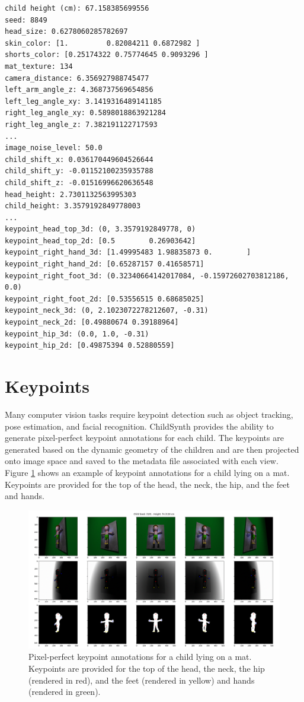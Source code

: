 \documentclass{article}
\begin{document}
\begin{lstlisting}[caption={Example metadata file}]
child height (cm): 67.158385699556 
seed: 8849
head_size: 0.6278060285782697
skin_color: [1.         0.82084211 0.6872982 ]
shorts_color: [0.25174322 0.75774645 0.9093296 ]
mat_texture: 134
camera_distance: 6.356927988745477
left_arm_angle_z: 4.368737569654856
left_leg_angle_xy: 3.1419316489141185
right_leg_angle_xy: 0.5898018863921284
right_leg_angle_z: 7.382191122717593
...
image_noise_level: 50.0
child_shift_x: 0.036170449604526644
child_shift_y: -0.01152100235935788
child_shift_z: -0.01516996620636548
head_height: 2.7301132563995303
child_height: 3.3579192849778003
...
keypoint_head_top_3d: (0, 3.3579192849778, 0)
keypoint_head_top_2d: [0.5        0.26903642]
keypoint_right_hand_3d: [1.49995483 1.98835873 0.        ]
keypoint_right_hand_2d: [0.65287157 0.41658571]
keypoint_right_foot_3d: (0.32340664142017084, -0.15972602703812186, 0.0)
keypoint_right_foot_2d: [0.53556515 0.68685025]
keypoint_neck_3d: (0, 2.1023072278212607, -0.31)
keypoint_neck_2d: [0.49880674 0.39188964]
keypoint_hip_3d: (0.0, 1.0, -0.31)
keypoint_hip_2d: [0.49875394 0.52880559]
\end{lstlisting}
\section{Keypoints}
Many computer vision tasks require keypoint detection such as object tracking, pose estimation, and facial recognition. ChildSynth provides the ability to generate pixel-perfect keypoint annotations for each child. The keypoints are generated based on the dynamic geometry of the children and are then projected onto image space and saved to the metadata file associated with each view. Figure \ref{fig:keypoints} shows an example of keypoint annotations for a child lying on a mat. Keypoints are provided for the top of the head, the neck, the hip, and the feet and hands. 

\begin{figure}[]
    \centering
    \includegraphics[width=\textwidth]{plots/kpoint.png}
    \caption{Pixel-perfect keypoint annotations for a child lying on a mat. Keypoints are provided for the top of the head, the neck, the hip (rendered in red), and the feet (rendered in yellow) and hands (rendered in green).}
    \label{fig:keypoints}
\end{figure}
\end{document}
